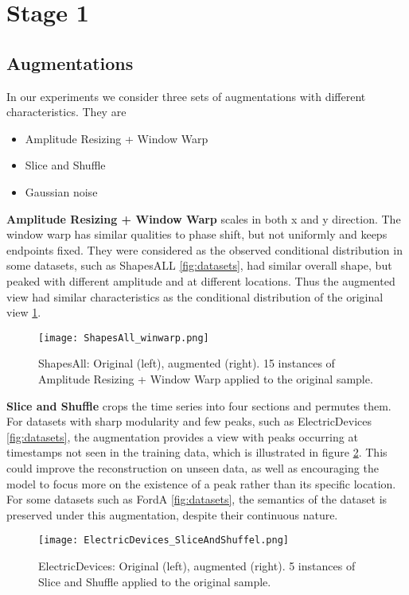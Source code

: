 \documentclass[../../thesis.tex]{subfiles}
\begin{document}
\section{Stage 1}


\subsection{Augmentations}
In our experiments we consider three sets of augmentations with different characteristics. They are
\begin{itemize}
    \item Amplitude Resizing + Window Warp
    \item Slice and Shuffle
    \item Gaussian noise
\end{itemize}

\textbf{Amplitude Resizing + Window Warp} scales in both x and y direction. The window warp has similar qualities to phase shift, but not uniformly and keeps endpoints fixed. They were considered as the observed conditional distribution in some datasets, such as ShapesALL \ref{fig:datasets}, had similar overall shape, but peaked with different amplitude and at different locations. Thus the augmented view had similar characteristics as the conditional distribution of the original view \ref{fig:ShapesAll_winwarp}. \newline

\begin{figure}[h]
    \label{fig:ShapesAll_winwarp}
    \texttt{[image: ShapesAll\_winwarp.png]}
    \centering
    \caption{ShapesAll: Original (left), augmented (right). 15 instances of Amplitude Resizing + Window Warp applied to the original sample.}
\end{figure}

\textbf{Slice and Shuffle} crops the time series into four sections and permutes them. For datasets with sharp modularity and few peaks, such as ElectricDevices \ref{fig:datasets}, the augmentation provides a view with peaks occurring at timestamps not seen in the training data, which is illustrated in figure \ref{fig:ElectricDevices_SliceAndShuffel}. This could improve the reconstruction on unseen data, as well as encouraging the model to focus more on the existence of a peak rather than its specific location. For some datasets such as FordA \ref{fig:datasets}, the semantics of the dataset is preserved under this augmentation, despite their continuous nature.\newline
\begin{figure}[h]
    \label{fig:ElectricDevices_SliceAndShuffel}
    \texttt{[image: ElectricDevices\_SliceAndShuffel.png]}
    \centering
    \caption{ElectricDevices: Original (left), augmented (right). 5 instances of Slice and Shuffle applied to the original sample.}
\end{figure}
\end{document}
